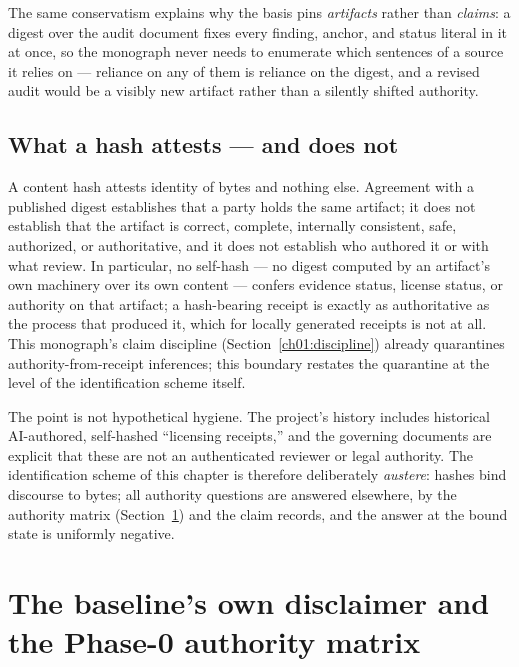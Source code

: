 The same conservatism explains why the basis pins \emph{artifacts}
rather than \emph{claims}: a digest over the audit document fixes every
finding, anchor, and status literal in it at once, so the monograph
never needs to enumerate which sentences of a source it relies on ---
reliance on any of them is reliance on the digest, and a revised audit
would be a visibly new artifact rather than a silently shifted
authority.

\subsection{What a hash attests --- and does not}\label{ch03:methodology:limits}

\begin{boundary}\label{ch03:bnd:hash}
A content hash attests identity of bytes and nothing else. Agreement
with a published digest establishes that a party holds the same
artifact; it does not establish that the artifact is correct, complete,
internally consistent, safe, authorized, or authoritative, and it does
not establish who authored it or with what review. In particular, no
self-hash --- no digest computed by an artifact's own machinery over
its own content --- confers evidence status, license status, or
authority on that artifact; a hash-bearing receipt is exactly as
authoritative as the process that produced it, which for locally
generated receipts is not at all. This monograph's claim discipline
(Section~\ref{ch01:discipline}) already quarantines authority-from-receipt
inferences; this boundary restates the quarantine at the level of the
identification scheme itself.
\end{boundary}

The point is not hypothetical hygiene. The project's history includes
historical AI-authored, self-hashed ``licensing receipts,'' and the
governing documents are explicit that these are not an authenticated
reviewer or legal authority. The identification scheme of this chapter
is therefore deliberately \emph{austere}: hashes bind discourse to
bytes; all authority questions are answered elsewhere, by the authority
matrix (Section~\ref{ch03:authority}) and the claim records, and the
answer at the bound state is uniformly negative.

\section{The baseline's own disclaimer and the Phase-0 authority matrix}\label{ch03:authority}

